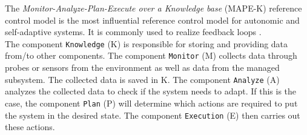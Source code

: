 The \textit{Monitor-Analyze-Plan-Execute over a Knowledge base} (MAPE-K) \cite{autonomic-computing} reference control model is the most influential reference control model for autonomic and self-adaptive systems. It is commonly used to realize feedback loops \cite{mape-k}.\\

The component \texttt{Knowledge} (K) is responsible for storing and providing data from/to other components. The component \texttt{Monitor} (M) collects data through probes or sensors from the environment as well as data from the managed subsystem. The collected data is saved in K. The component \texttt{Analyze} (A) analyzes the collected data to check if the system needs to adapt. If this is the case, the component \texttt{Plan} (P) will determine which actions are required to put the system in the desired state. The component \texttt{Execution} (E) then carries out these actions. \cite{mape-k}  